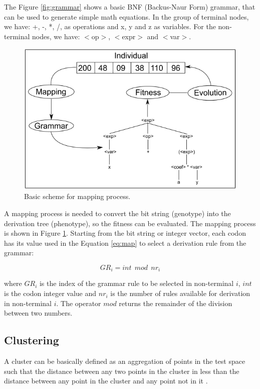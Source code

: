 \documentclass[journal]{IEEEtran}
\begin{document}
The Figure \ref{fig:grammar} shows a basic BNF (Backus-Naur Form) grammar, that can be used to generate simple math equations. In the group of terminal nodes, we have: +, -, *, /, as operations and x, y and z as variables. For the non-terminal nodes, we have: $<$op$>$, $<$expr$>$ and $<$var$>$.

\begin{figure}[!htb]
	\centering
	\includegraphics[scale=.4]{figures/ge_algo.png}
	\caption{Basic scheme for mapping process. \cite{cerri2013grammatical}}
	\label{fig:ge_algo}
\end{figure}

A mapping process is needed to convert the bit string (genotype) into the derivation tree (phenotype), so the fitness can be evaluated. The mapping process is shown in Figure \ref{fig:ge_algo}. Starting from the bit string or integer vector, each codon has its value used in the Equation \ref{eq:map} to select a derivation rule from the grammar:

\begin{equation}\label{eq:map}
GR_i = int~~mod~~nr_i
\end{equation}

where $GR_i$ is the index of the grammar rule to be selected in non-terminal $i$, $int$ is the codon integer value and $nr_i$ is the number of rules available for derivation in non-terminal $i$. The operator $mod$ returns the remainder of the division between two numbers.

\subsection{Clustering}

A cluster can be basically defined as an aggregation of points in the test space such that the distance between any two points in the cluster in less than the distance between any point in the cluster and any point not in it \cite{jain1988algorithms}.
\end{document}
